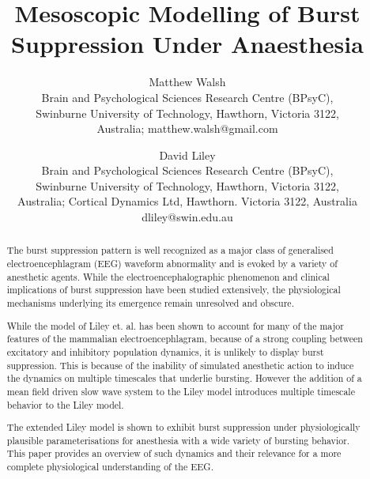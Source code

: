 \documentclass[a4paper,12pt]{article}
\begin{document}
\title{Mesoscopic Modelling of Burst Suppression Under Anaesthesia}
\maketitle
\author{
    Matthew Walsh\\
    Brain and Psychological Sciences Research Centre (BPsyC),\\
    Swinburne University of Technology, Hawthorn, Victoria 3122,\\
    Australia; 
    matthew.walsh@gmail.com\\
  \and
    David Liley\\
    Brain and Psychological Sciences Research Centre (BPsyC),\\
    Swinburne University of Technology, Hawthorn, Victoria 3122,\\
    Australia; Cortical Dynamics Ltd, Hawthorn. Victoria 3122, Australia\\
    dliley@swin.edu.au\\
}

\begin{abstract}
The burst suppression pattern is well recognized as
a major class of generalised electroencephlagram (EEG) waveform abnormality 
and is evoked by a variety of anesthetic agents. 
While the electroencephalographic phenomenon and clinical
implications of burst suppression have been studied extensively, the physiological mechanisms
underlying its emergence remain unresolved and obscure. 

While the model of Liley et. al. has been shown to account for many of the major features of the 
mammalian electroencephlagram, because of a strong coupling between excitatory and inhibitory population dynamics,  
it is unlikely to display burst suppression. This is because of the inability of simulated anesthetic action 
to induce the dynamics on multiple timescales that underlie bursting.
However the addition of a mean field driven slow wave system to the Liley model introduces 
multiple timescale behavior to the Liley model.

The extended Liley model is shown to exhibit burst suppression under physiologically 
plausible parameterisations for anesthesia with a wide variety of bursting behavior. 
This paper provides an overview of such dynamics and their relevance for a more 
complete physiological understanding of the EEG.

\end{abstract}
\end{document}
